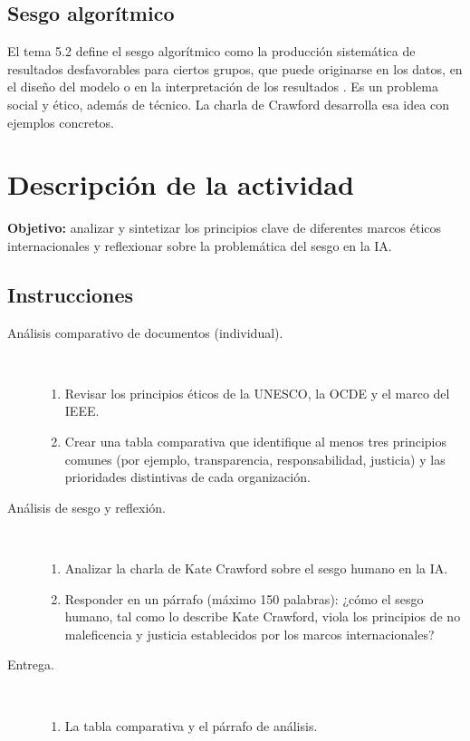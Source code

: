 \documentclass[11pt,letterpaper]{article}
\begin{document}
\subsection{Sesgo algorítmico}

El tema 5.2 define el sesgo algorítmico como la producción sistemática de resultados desfavorables para ciertos grupos, que puede originarse en los datos, en el diseño del modelo o en la interpretación de los resultados \parencite{iae_u5_t51}. Es un problema social y ético, además de técnico. La charla de Crawford \parencite{crawford2017} desarrolla esa idea con ejemplos concretos.

\section{Descripción de la actividad}

\textbf{Objetivo:} analizar y sintetizar los principios clave de diferentes marcos éticos internacionales y reflexionar sobre la problemática del sesgo en la IA.

\subsection*{Instrucciones}

\begin{description}
    \item[Análisis comparativo de documentos (individual).]\mbox{}\\[-1.3\baselineskip]
    \begin{enumerate}
        \item Revisar los principios éticos de la UNESCO, la OCDE y el marco del IEEE.
        \item Crear una tabla comparativa que identifique al menos tres principios comunes (por ejemplo, transparencia, responsabilidad, justicia) y las prioridades distintivas de cada organización.
    \end{enumerate}
    \item[Análisis de sesgo y reflexión.]\mbox{}\\[-1.3\baselineskip]
    \begin{enumerate}
        \item Analizar la charla de Kate Crawford sobre el sesgo humano en la IA.
        \item Responder en un párrafo (máximo 150 palabras): ¿cómo el sesgo humano, tal como lo describe Kate Crawford, viola los principios de no maleficencia y justicia establecidos por los marcos internacionales?
    \end{enumerate}
    \item[Entrega.]\mbox{}\\[-1.3\baselineskip]
    \begin{enumerate}
        \item La tabla comparativa y el párrafo de análisis.
    \end{enumerate}
\end{description}
\end{document}
